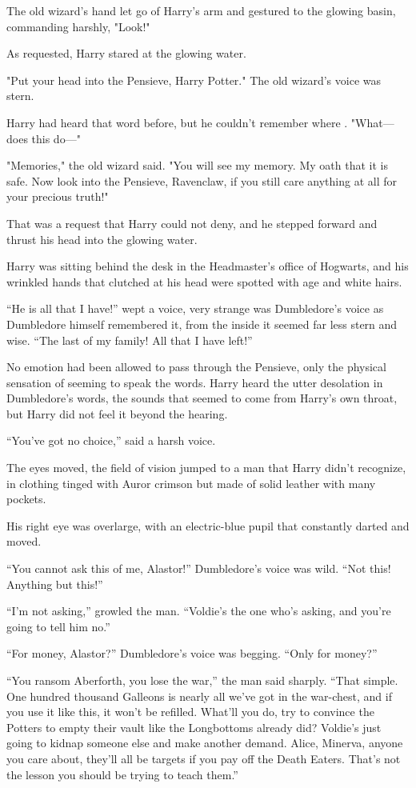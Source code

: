The old wizard's hand let go of Harry's arm and gestured to the glowing basin,
commanding harshly, "Look!"

As requested, Harry stared at the glowing water.

"Put your head into the Pensieve, Harry Potter." The old wizard's voice was
stern.

Harry had heard that word before, but he couldn't remember where . "What—does
this do—"

"Memories," the old wizard said. "You will see my memory. My oath that it is
safe. Now look into the Pensieve, Ravenclaw, if you still care anything at all
for your precious truth!"

That was a request that Harry could not deny, and he stepped forward and thrust
his head into the glowing water.
\sbreak
\begin{em}
Harry was sitting behind the desk in the Headmaster's office of Hogwarts,
and his wrinkled hands that clutched at his head were spotted with age and
white hairs.

``He is all that I have!'' wept a voice, very strange was Dumbledore's
voice as Dumbledore himself remembered it, from the inside it seemed far less
stern and wise. ``The last of my family! All that I have left!''

No emotion had been allowed to pass through the Pensieve, only the
physical sensation of seeming to speak the words. Harry heard the utter
desolation in Dumbledore's words, the sounds that seemed to come from Harry's
own throat, but Harry did not feel it beyond the hearing.

``You've got no choice,'' said a harsh voice.

The eyes moved, the field of vision jumped to a man that Harry didn't
recognize, in clothing tinged with Auror crimson but made of solid leather with
many pockets.

His right eye was overlarge, with an electric-blue pupil that constantly
darted and moved.

``You cannot ask this of me, Alastor!'' Dumbledore's voice was wild. ``Not
this! Anything but this!''

``I'm not asking,'' growled the man. ``Voldie's the one who's asking, and
you're going to tell him no.''

``For money, Alastor?'' Dumbledore's voice was begging. ``Only for money?''

``You ransom Aberforth, you lose the war,'' the man said sharply. ``That
simple. One hundred thousand Galleons is nearly all we've got in the war-chest,
and if you use it like this, it won't be refilled. What'll you do, try to
convince the Potters to empty their vault like the Longbottoms already did?
Voldie's just going to kidnap someone else and make another demand. Alice,
Minerva, anyone you care about, they'll all be targets if you pay off the Death
Eaters. That's not the lesson you should be trying to teach them.''


\end{em}
